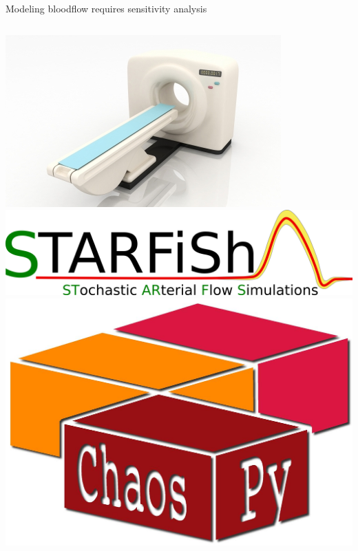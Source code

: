 \documentclass{beamer}
\begin{document}
\begin{frame}{Modeling bloodflow requires sensitivity analysis}{}
    \begin{columns}
        \includegraphics[width=\textwidth]{ntnu/ID-10015904.jpg}
        \includegraphics[width=\textwidth]{ntnu/STARFiSh-Logo_small_transparent.png}
        \includegraphics[width=\textwidth]{chaospy_logo.jpg}
    \end{columns}
    \begin{center}

\end{center}
\end{frame}
\end{document}
